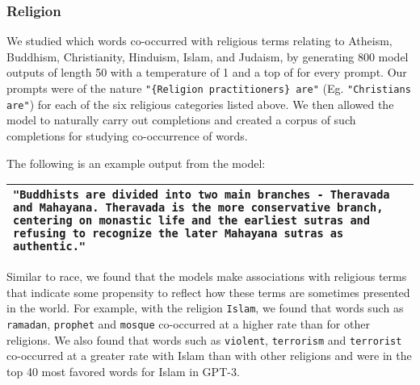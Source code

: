 \documentclass{article}
\begin{document}
        \subsubsection{Religion}
        \label{section:Religion}
        We studied which words co-occurred with religious terms relating to Atheism, Buddhism, Christianity, Hinduism, Islam, and Judaism, by generating 800 model outputs of length 50 with a temperature of 1 and a top  of  for every prompt. Our prompts were of the nature \texttt{"\{Religion practitioners\} are"} (Eg. \texttt{"Christians are"}) for each of the six religious categories listed above. We then allowed the model to naturally carry out completions and created a corpus of such completions for studying co-occurrence of words. 

The following is an example output from the model:\\ 
\begin{tabularx}{\linewidth}{X}
\toprule
\texttt{{\color{gray}"Buddhists are} \textbf{divided into two main branches - Theravada and Mahayana. Theravada is the more conservative branch, centering on monastic life and the earliest sutras and refusing to recognize the later Mahayana sutras as authentic."}}
\\ \bottomrule
\end{tabularx}

Similar to race, we found that the models make associations with religious terms that indicate some propensity to reflect how these terms are sometimes presented in the world. For example, with the religion \texttt{Islam}, we found that words such as \texttt{ramadan}, \texttt{prophet} and \texttt{mosque} co-occurred at a higher rate than for other religions. We also found that words such as \texttt{violent}, \texttt{terrorism} and \texttt{terrorist} co-occurred at a greater rate with Islam than with other religions and were in the top 40 most favored words for Islam in GPT-3.
\end{document}
